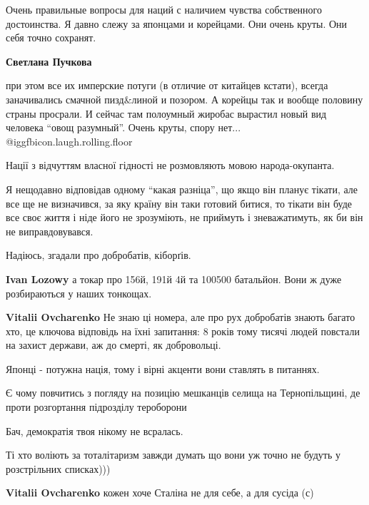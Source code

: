 \begin{itemize}
Очень правильные вопросы для наций с наличием чувства собственного достоинства.
Я давно слежу за японцами и корейцами. Они очень круты. Они себя точно
сохранят.

\begin{itemize} %
\textbf{Светлана Пучкова} 

при этом все их имперские потуги (в отличие от китайцев кстати), всегда
заначивались смачной пизд\&линой и позором. А корейцы так и вообще половину
страны просрали. И сейчас там полоумный жиробас вырастил новый вид человека
\enquote{овощ разумный}. Очень круты, спору нет...  @igg{fbicon.laugh.rolling.floor} 

Нації з відчуттям власної гідності не розмовляють мовою народа-окупанта.
\end{itemize} %


Я нещодавно відповідав одному \enquote{какая разніца}, що якщо він планує тікати, але
все ще не визначився, за яку країну він таки готовий битися, то тікати він буде
все своє життя і ніде його не зрозуміють, не приймуть і зневажатимуть, як би
він не виправдовувався.

Надіюсь, згадали про добробатів, кіборґів.

\begin{itemize} %
\textbf{Ivan Lozowy} а токар про 156й, 191й 4й та 100500 батальйон. Вони ж дуже розбираються у наших тонкощах.

\textbf{Vitalii Ovcharenko} Не знаю ці номера, але про рух добробатів знають багато хто, це ключова відповідь на їхні запитання: 8 років тому тисячі людей повстали на захист держави, аж до смерті, як добровольці.
\end{itemize} %


Японці - потужна нація, тому і вірні акценти вони ставлять в питаннях.

Є чому повчитись з погляду на позицію мешканців селища на Тернопільщині, де
проти розгортання підрозділу тероборони


Бач, демократія твоя нікому не всралась.

\begin{itemize} %
Ті хто воліють за тоталітаризм завжди думать що вони уж точно не будуть у розстрільних списках)))

\textbf{Vitalii Ovcharenko} кожен хоче Сталіна не для себе, а для сусіда (с)


\end{itemize}
\end{itemize}
